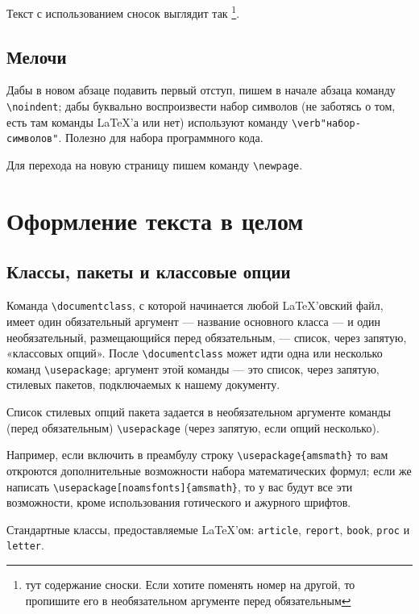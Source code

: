 \documentclass[a4paper,11pt]{article} %
\begin{document}
Текст с использованием сносок выглядит так
\footnote{
	тут содержание сноски. Если хотите поменять номер на другой, то пропишите его в необязательном аргументе перед обязательным
}.

\subsection{Мелочи}

Дабы в новом абзаце подавить первый отступ, пишем в начале абзаца команду \verb"\noindent";
дабы буквально воспроизвести набор символов (не заботясь о том, есть там команды \LaTeX'а или нет) используют команду \verb|\verb"набор-символов"|. Полезно для набора программного кода.

Для перехода на новую страницу пишем команду \verb"\newpage".

\newpage



\section{Оформление текста в целом}


\subsection{Классы, пакеты и классовые опции}

Команда \verb"\documentclass", с которой начинается любой \LaTeX’овский файл, имеет один обязательный аргумент --- название основного класса --- и один необязательный, размещающийся перед обязательным, --- список, через запятую, «классовых опций». После \verb"\documentclass" может идти одна или несколько команд \verb"\usepackage"; аргумент этой команды --- это список, через запятую, стилевых пакетов, подключаемых к нашему документу.

Список стилевых опций пакета задается в необязательном аргументе команды (перед обязательным) \verb"\usepackage" (через запятую, если опций несколько).

Например, если включить в преамбулу строку
\verb"\usepackage{amsmath}" то вам откроются дополнительные возможности набора математических формул; если же написать \verb"\usepackage[noamsfonts]{amsmath}", то у вас будут все эти возможности, кроме использования готического и ажурного шрифтов.
{\sloppy

}

Стандартные классы, предоставляемые \LaTeX’ом: {\tt article}, {\tt report}, {\tt book}, {\tt proc} и {\tt letter}.
\end{document}
